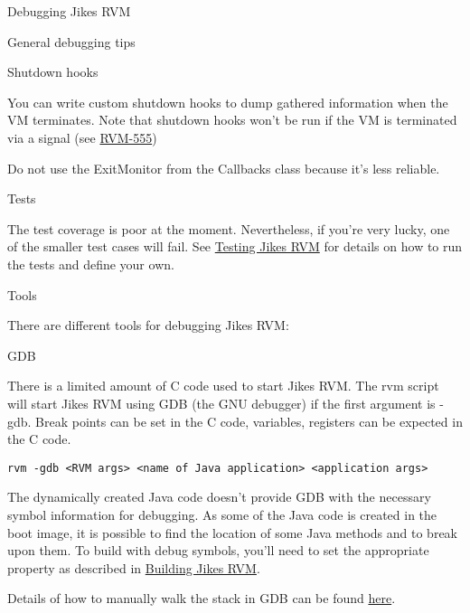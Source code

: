 \begin{chapter}{Debugging Jikes RVM}
\begin{section}{General debugging tips}
\begin{subsection}{Shutdown hooks}

You can write custom shutdown hooks to dump gathered information when the VM terminates. Note that shutdown hooks won't be run if the VM is terminated via a signal (see \href{https://xtenlang.atlassian.net/browse/RVM-555}{RVM-555})

Do not use the ExitMonitor from the Callbacks class because it's less reliable.

\end{subsection}

\begin{subsection}{Tests}

The test coverage is poor at the moment. Nevertheless, if you're very lucky, one of the smaller test cases will fail. See \hyperref[cha:testingjikesrvm]{Testing Jikes RVM} for details on how to run the tests and define your own.

\end{subsection}

\end{section}

\begin{section}{Tools}

There are different tools for debugging Jikes RVM:

\begin{subsection}{GDB}

There is a limited amount of C code used to start Jikes RVM. The rvm script will start Jikes RVM using GDB (the GNU debugger) if the first argument is -gdb. Break points can be set in the C code, variables, registers can be expected in the C code.

\begin{lstlisting}
rvm -gdb <RVM args> <name of Java application> <application args>
\end{lstlisting}

The dynamically created Java code doesn't provide GDB with the necessary symbol information for debugging. As some of the Java code is created in the boot image, it is possible to find the location of some Java methods and to break upon them. To build with debug symbols, you'll need to set the appropriate property as described in \hyperref[cha:buildingjikesrvm]{Building Jikes RVM}.

Details of how to manually walk the stack in GDB can be found \hyperref[sec:gdbstackwalking]{here}.
\end{subsection}


\end{section}
\end{chapter}
